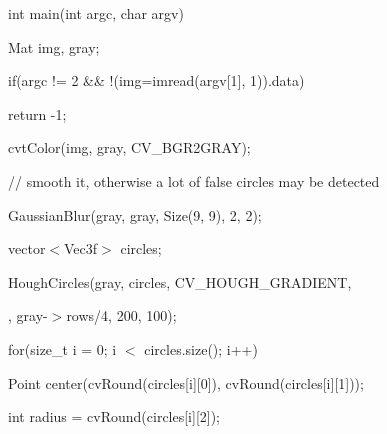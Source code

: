 {\ttfamily int main(int argc, char argv)}

{\ttfamily }

{\ttfamily }

{\ttfamily Mat img, gray;}

{\ttfamily }

{\ttfamily }

{\ttfamily if(argc != 2 \&\& !(img=imread(argv\mbox{[}1\mbox{]}, 1)).data)}

{\ttfamily }

{\ttfamily }

{\ttfamily return -\/1;}

{\ttfamily }

{\ttfamily }

{\ttfamily cvt\+Color(img, gray, C\+V\+\_\+\+B\+G\+R2\+G\+R\+A\+Y);}

{\ttfamily }

{\ttfamily }

{\ttfamily // smooth it, otherwise a lot of false circles may be detected}

{\ttfamily }

{\ttfamily }

{\ttfamily Gaussian\+Blur(gray, gray, Size(9, 9), 2, 2);}

{\ttfamily }

{\ttfamily }

{\ttfamily vector$<$\+Vec3f$>$ circles;}

{\ttfamily }

{\ttfamily }

{\ttfamily Hough\+Circles(gray, circles, C\+V\+\_\+\+H\+O\+U\+G\+H\+\_\+\+G\+R\+A\+D\+I\+E\+NT,}

{\ttfamily }

{\ttfamily }

{, gray-\/$>$rows/4, 200, 100);}

{\ttfamily }

{\ttfamily }

{\ttfamily for(size\+\_\+t i = 0; i $<$ circles.\+size(); i++)}

{\ttfamily }

{\ttfamily }

{\ttfamily Point center(cv\+Round(circles\mbox{[}i\mbox{]}\mbox{[}0\mbox{]}), cv\+Round(circles\mbox{[}i\mbox{]}\mbox{[}1\mbox{]}));}

{\ttfamily }

{\ttfamily }

{\ttfamily int radius = cv\+Round(circles\mbox{[}i\mbox{]}\mbox{[}2\mbox{]});}

